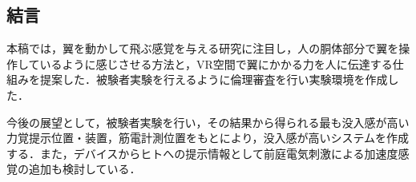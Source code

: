 \begin{small}



\section{結言}
  本稿では，翼を動かして飛ぶ感覚を与える研究に注目し，人の胴体部分で翼を操作しているように感じさせる方法と，VR空間で翼にかかる力を人に伝達する仕組みを提案した．被験者実験を行えるように倫理審査を行い実験環境を作成した．

  今後の展望として，被験者実験を行い，その結果から得られる最も没入感が高い力覚提示位置・装置，筋電計測位置をもとにより，没入感が高いシステムを作成する．また，デバイスからヒトへの提示情報として前庭電気刺激による加速度感覚\cite{青山一真2014前庭電気刺激における逆方向不感電流を用いた加速度感覚の増強}の追加も検討している．


{
\small
 \setlength{\kanjiskip}{0.0zw plus.01zw} %
 \setlength{\baselineskip}{9pt}        %
 \setlength{\itemsep}{0.2pt}             %
 \setlength{\lineskip}{0pt}              %


}



\end{small}


